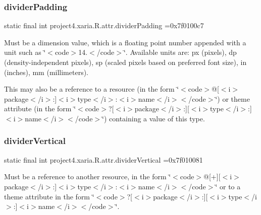 \subsubsection{\texorpdfstring{divider\+Padding}{dividerPadding}}
{\footnotesize\ttfamily static final int project4.\+xaria.\+R.\+attr.\+divider\+Padding =0x7f0100c7\hspace{0.3cm}{\ttfamily [static]}}

Must be a dimension value, which is a floating point number appended with a unit such as \char`\"{}$<$code$>$14.\+5sp$<$/code$>$\char`\"{}. Available units are\+: px (pixels), dp (density-\/independent pixels), sp (scaled pixels based on preferred font size), in (inches), mm (millimeters). 

This may also be a reference to a resource (in the form \char`\"{}$<$code$>$@\mbox{[}$<$i$>$package$<$/i$>$\+:\mbox{]}$<$i$>$type$<$/i$>$\+:$<$i$>$name$<$/i$>$$<$/code$>$\char`\"{}) or theme attribute (in the form \char`\"{}$<$code$>$?\mbox{[}$<$i$>$package$<$/i$>$\+:\mbox{]}\mbox{[}$<$i$>$type$<$/i$>$\+:\mbox{]}$<$i$>$name$<$/i$>$$<$/code$>$\char`\"{}) containing a value of this type. \mbox{\label{classproject4_1_1xaria_1_1R_1_1attr_ae52e420b949d1eea057825fa5dfaa5ab}} 
\subsubsection{\texorpdfstring{divider\+Vertical}{dividerVertical}}
{\footnotesize\ttfamily static final int project4.\+xaria.\+R.\+attr.\+divider\+Vertical =0x7f010081\hspace{0.3cm}{\ttfamily [static]}}

Must be a reference to another resource, in the form \char`\"{}$<$code$>$@\mbox{[}+\mbox{]}\mbox{[}$<$i$>$package$<$/i$>$\+:\mbox{]}$<$i$>$type$<$/i$>$\+:$<$i$>$name$<$/i$>$$<$/code$>$\char`\"{} or to a theme attribute in the form \char`\"{}$<$code$>$?\mbox{[}$<$i$>$package$<$/i$>$\+:\mbox{]}\mbox{[}$<$i$>$type$<$/i$>$\+:\mbox{]}$<$i$>$name$<$/i$>$$<$/code$>$\char`\"{}. \mbox{\label{classproject4_1_1xaria_1_1R_1_1attr_aaa603362b15526875c64569e92661460}} 
